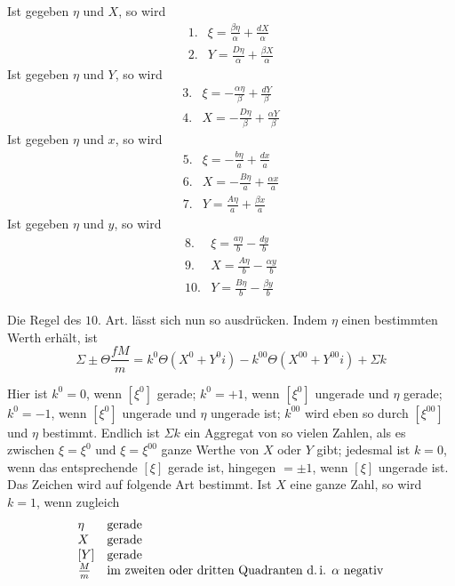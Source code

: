 Ist gegeben $\eta$ und $X$, so wird
\[
\begin{array}{rl}
1.&\xi=\frac{\beta\eta}{\alpha}+\frac{dX}{\alpha}\\[3pt]
2.&Y=\frac{D\eta}{\alpha}+\frac{\beta X}{\alpha}
\end{array}
\]
Ist gegeben $\eta$ und $Y$, so wird
\[
\begin{array}{rl}
3.&\xi=-\frac{\alpha\eta}{\beta}+\frac{dY}{\beta}\\[3pt]
4.&X=-\frac{D\eta}{\beta}+\frac{\alpha Y}{\beta}
\end{array}
\]
Ist gegeben $\eta$ und $x$, so wird
\[
\begin{array}{rl}
5.&\xi=-\frac{b\eta}{a}+\frac{dx}{a}\\[3pt]
6.&X=-\frac{B\eta}{a}+\frac{\alpha x}{a}\\[3pt]
7.&Y=\frac{A\eta}{a}+\frac{\beta x}{a}
\end{array}
\]
Ist gegeben $\eta$ und $y$, so wird
\[
\begin{array}{rl}
8.&\xi=\frac{a\eta}{b}-\frac{dy}{b}\\[3pt]
9.&X=\frac{A\eta}{b}-\frac{\alpha y}{b}\\[3pt]
10.&Y=\frac{B\eta}{b}-\frac{\beta y}{b}
\end{array}
\]

Die Regel des $10$. Art. lässt sich nun so ausdrücken. Indem $\eta$ einen bestimmten Werth erhält, ist
\[
\Sigma\pm\Theta\frac{fM}{m}=k^0\Theta(X^0+Y^0i)-k^{00}\Theta(X^{00}+Y^{00}i)+\Sigma k
\]

%
Hier ist $k^0=0$, wenn $[\xi^0]$ gerade; $k^0=+1$, wenn $[\xi^0]$ ungerade und $\eta$ gerade; $k^0=-1$, wenn $[\xi^0]$ ungerade und $\eta$ ungerade ist; $k^{00}$ wird eben so durch $[\xi^{00}]$ und $\eta$ bestimmt. Endlich ist $\Sigma k$ ein Aggregat von so vielen Zahlen, als es zwischen $\xi=\xi^0$ und $\xi=\xi^{00}$ ganze Werthe von $X$ oder $Y$ gibt; jedesmal ist $k=0$, wenn das entsprechende $[\xi]$ gerade ist, hingegen $=\pm1$, wenn $[\xi]$ ungerade ist. Das Zeichen wird auf folgende Art bestimmt. Ist $X$ eine ganze Zahl, so wird $k=1$, wenn zugleich
\[
\begin{array}{ll}
\eta&\text{gerade}\\
X&\text{gerade}\\
\relax[Y]&\text{gerade}\\
\frac{M}{m}&\text{im zweiten oder dritten Quadranten d.\,i. }\alpha\text{ negativ}
\end{array}
\]

